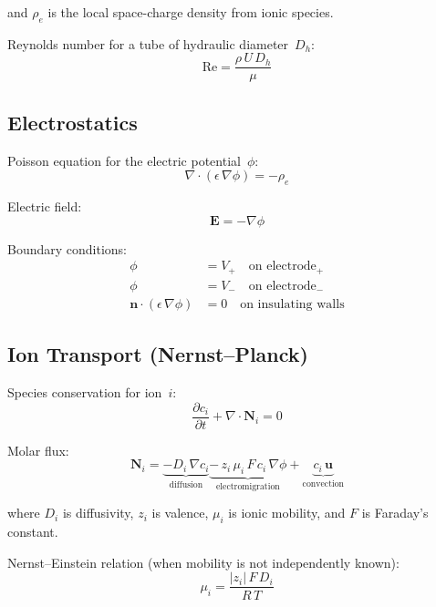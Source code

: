 \documentclass[11pt,a4paper]{article}
\begin{document}
and $\rho_{e}$ is the local space-charge density from ionic species.

Reynolds number for a tube of hydraulic diameter~$D_h$:
\begin{equation}
  \mathrm{Re} = \frac{\rho\,U\,D_h}{\mu}
\end{equation}

\subsection{Electrostatics}

Poisson equation for the electric potential~$\phi$:
\begin{equation}
  \nabla\cdot\!\left(\epsilon\,\nabla\phi\right) = -\rho_{e}
\end{equation}

Electric field:
\begin{equation}
  \bm{E} = -\nabla\phi
\end{equation}

Boundary conditions:
\begin{align}
  \phi &= V_{+} \quad\text{on electrode}_{+} \\
  \phi &= V_{-} \quad\text{on electrode}_{-} \\
  \bm{n}\cdot(\epsilon\,\nabla\phi) &= 0
    \quad\text{on insulating walls}
\end{align}

\subsection{Ion Transport (Nernst--Planck)}

Species conservation for ion~$i$:
\begin{equation}
  \frac{\partial c_{i}}{\partial t} + \nabla\cdot\bm{N}_{i} = 0
\end{equation}

Molar flux:
\begin{equation}\label{eq:NP}
  \bm{N}_{i}
  = \underbrace{-D_{i}\,\nabla c_{i}}_{\text{diffusion}}
    \underbrace{-\,z_{i}\,\mu_{i}\,F\,c_{i}\,\nabla\phi}_{\text{electromigration}}
    + \underbrace{c_{i}\,\bm{u}}_{\text{convection}}
\end{equation}

where $D_i$ is diffusivity, $z_i$ is valence, $\mu_i$ is ionic mobility, and
$F$ is Faraday's constant.

Nernst--Einstein relation (when mobility is not independently known):
\begin{equation}
  \mu_{i} = \frac{|z_i|\,F\,D_i}{R\,T}
\end{equation}
\end{document}
